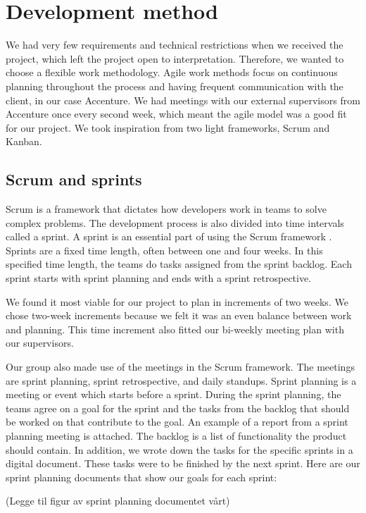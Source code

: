 
\section{Development method}
We had very few requirements and technical restrictions when we received the project, which left the project open to interpretation. Therefore, we wanted to choose a flexible work methodology. Agile work methods focus on continuous planning throughout the process and having frequent communication with the client, in our case Accenture. We had meetings with our external supervisors from Accenture once every second week, which meant the agile model was a good fit for our project. We took inspiration from two light frameworks, Scrum and Kanban.

\subsection{Scrum and sprints}
Scrum is a framework that dictates how developers work in teams to solve complex problems. The development process is also divided into time intervals called a sprint. A sprint is an essential part of using the Scrum framework \parencite{prosjektveilederen}. Sprints are a fixed time length, often between one and four weeks. In this specified time length, the teams do tasks assigned from the sprint backlog. Each sprint starts with sprint planning and ends with a sprint retrospective.

We found it most viable for our project to plan in increments of two weeks. We chose two-week increments because we felt it was an even balance between work and planning. This time increment also fitted our bi-weekly meeting plan with our supervisors.

Our group also made use of the meetings in the Scrum framework. The meetings are sprint planning, sprint retrospective, and daily standups. Sprint planning is a meeting or event which starts before a sprint. During the sprint planning, the teams agree on a goal for the sprint and the tasks from the backlog that should be worked on that contribute to the goal. An example of a report from a sprint planning meeting is attached. The backlog is a list of functionality the product should contain. In addition, we wrote down the tasks for the specific sprints in a digital document. These tasks were to be finished by the next sprint. Here are our sprint planning documents that show our goals for each sprint:

(Legge til figur av sprint planning documentet vårt)

